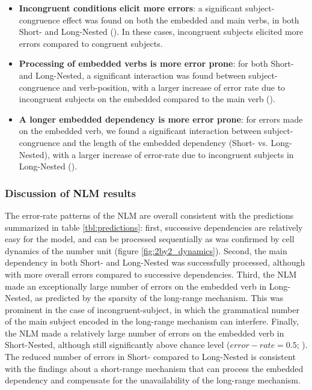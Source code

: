 \begin{itemize}
    \item \textbf{Incongruent conditions elicit more errors}: a significant subject-congruence effect was found on both the embedded and main verbs, in both Short- and Long-Nested (). In these cases, incongruent subjects elicited more errors compared to congruent subjects.
    \item \textbf{Processing of embedded verbs is more error prone}: for both Short- and Long-Nested, a significant interaction was found between subject-congruence and verb-position, with a larger increase of error rate due to incongruent subjects on the embedded compared to the main verb ().
    \item \textbf{A longer embedded dependency is more error prone}: for errors made on the embedded verb, we found a significant interaction between subject-congruence and the length of the embedded dependency (Short- vs. Long-Nested), with a larger increase of error-rate due to incongruent subjects in Long-Nested ().
\end{itemize}
 
\vspace{10pt}

\subsubsection{Discussion of NLM results}
The error-rate patterns of the NLM are overall consistent with the predictions summarized in table \ref{tbl:predictions}: first, successive dependencies are relatively easy for the model, and can be processed sequentially as was confirmed by cell dynamics of the number unit (figure \ref{fig:2by2_dynamics}). Second, the main dependency in both Short- and Long-Nested was successfully processed, although with more overall errors compared to successive dependencies. Third, the NLM made an exceptionally large number of errors on the embedded verb in Long-Nested, as predicted by the sparsity of the long-range mechanism. This was prominent in the case of incongruent-subject, in which the grammatical number of the main subject encoded in the long-range mechanism can interfere. Finally, the NLM made a relatively large number of errors on the embedded verb in Short-Nested, although still significantly above chance level ($error-rate = 0.5$; ). The reduced number of errors in Short- compared to Long-Nested is consistent with the findings about a short-range mechanism that can process the embedded dependency and compensate for the unavailability of the long-range mechanism. 

